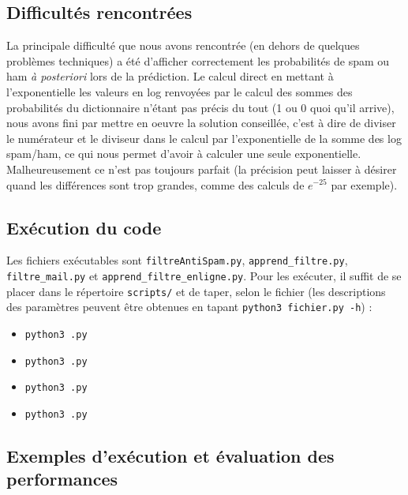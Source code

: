 \documentclass{report}
\begin{document}
\subsection*{Difficultés rencontrées}

La principale difficulté que nous avons rencontrée (en dehors de quelques problèmes techniques) a été d'afficher correctement les probabilités de spam ou ham \textit{à posteriori} lors de la prédiction. Le calcul direct en mettant à l'exponentielle les valeurs en log renvoyées par le calcul des sommes des probabilités du dictionnaire n'étant pas précis du tout (1 ou 0 quoi qu'il arrive), nous avons fini par mettre en oeuvre la solution conseillée, c'est à dire de diviser le numérateur et le diviseur dans le calcul par l'exponentielle de la somme des log spam/ham, ce qui nous permet d'avoir à calculer une seule exponentielle. Malheureusement ce n'est pas toujours parfait (la précision peut laisser à désirer quand les différences sont trop grandes, comme des calculs de $e^{-25}$ par exemple).

\subsection*{Exécution du code}

Les fichiers exécutables sont \verb|filtreAntiSpam.py|, \verb|apprend_filtre.py|, \verb|filtre_mail.py| et \verb|apprend_filtre_enligne.py|. Pour les exécuter, il suffit de se placer dans le répertoire \verb|scripts/| et de taper, selon le fichier (les descriptions des paramètres peuvent être obtenues en tapant \verb|python3 fichier.py -h|) : 
\begin{itemize}
\item \verb|python3 .py|
\item \verb|python3 .py|
\item \verb|python3 .py|
\item \verb|python3 .py|
\end{itemize}

\subsection*{Exemples d'exécution et évaluation des performances}
\end{document}
